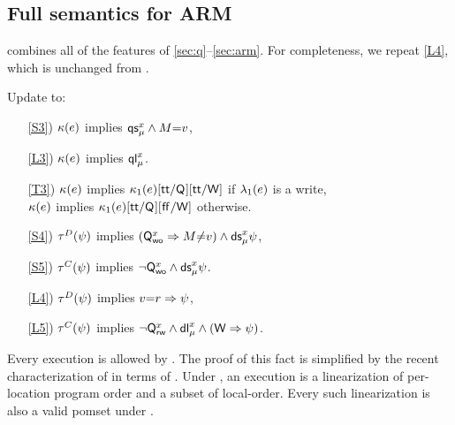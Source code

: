 \subsection{Full semantics for ARM}

 combines all of the features of
\textsection\ref{sec:q}--\ref{sec:arm}.  For completeness, we repeat
\ref{L4}, which is unchanged from .

\begin{definition}[$\xCO$/$\xRASC$/$\xDGR$/$\xRRD$]
  \label{def:pomsets-arm}
  Update  to:
  \begin{enumerate}
  \item[\ref{S3})]
    $\labelingForm(\aEv)$ implies $\QS{\aLoc}{\amode}\land\aExp{=}\aVal$,
  \item[\ref{L3})]
    $\labelingForm(\aEv)$ implies $\QL{\aLoc}{\amode}$.
  \item[\ref{T3})]
    $\labelingForm(\aEv)$ implies
    $\labelingForm_1(\aEv)[\TRUE/\Q{}][\TRUE/\RW]$ if $\labelingAct_1(\aEv)$ is a write,
    \\
    $\labelingForm(\aEv)$ implies
    $\labelingForm_1(\aEv)[\TRUE/\Q{}][\FALSE/\RW]$ otherwise.
  \end{enumerate}
  \begin{enumerate}
  \item[\ref{S4})]
    $\aTr{\bEvs}{\bForm}$ implies $(\Qw{\aLoc}\limplies\aExp{\neq}\aVal)\land \DS{\aLoc}{\amode}\bForm\noSUB{[\aExp/\aLoc]}$,
  \item[\ref{S5})]
    $\aTr{\cEvs}{\bForm}$ implies $\lnot\Qw{\aLoc}\land \DS{\aLoc}{\amode}\bForm\noSUB{[\aExp/\aLoc]}$.
  \item[\ref{L4})]
    $\aTr{\bEvs}{\bForm}$ implies $\aVal{=}\aReg\limplies\bForm$, 
  \item[\ref{L5})]
    $\aTr{\cEvs}{\bForm}$ implies $\lnot\Qx{\aLoc} \land \DL{\aLoc}{\amode}
    \land (\RW\limplies\bForm)$.
  \end{enumerate}  
\end{definition}

Every \armeight{} execution is allowed by .  The
proof of this fact is simplified by the recent characterization of
\armeight{} in terms of \EGC{} \cite[\textsection
B2.3.6]{arm-reference-manual}.  Under \EGC{}, an \armeight{} execution is a
linearization of per-location program order and a subset of local-order.
Every such linearization is also a valid pomset under
.

